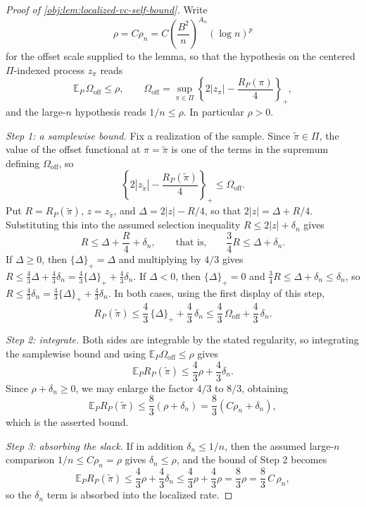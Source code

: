 \documentclass[11pt]{article}
\begin{document}
\begin{proof}[Proof of \cref{obj:lem:localized-vc-self-bound}]
Write
\[
\rho=C\rho_n=C\left(\frac{B^2}{n}\right)^{A_\alpha}(\log n)^p
\]
for the offset scale supplied to the lemma, so that the hypothesis on the centered \(\Pi\)-indexed process \(z_\pi\) reads
\[
\mathbb E_P\,\Omega_{\mathrm{off}}\le\rho,
\qquad
\Omega_{\mathrm{off}}=
\sup_{\pi\in\Pi}
\left\{2|z_\pi|-\frac{R_P(\pi)}4\right\}_{+},
\]
and the large-\(n\) hypothesis reads \(1/n\le\rho\).  In particular \(\rho>0\).

\emph{Step 1: a samplewise bound.}  Fix a realization of the sample.  Since \(\widetilde\pi\in\Pi\), the value of the offset functional at \(\pi=\widetilde\pi\) is one of the terms in the supremum defining \(\Omega_{\mathrm{off}}\), so
\[
\left\{2|z_{\widetilde\pi}|-\frac{R_P(\widetilde\pi)}4\right\}_{+}\le\Omega_{\mathrm{off}} .
\]
Put \(R=R_P(\widetilde\pi)\), \(z=z_{\widetilde\pi}\), and \(\Delta=2|z|-R/4\), so that \(2|z|=\Delta+R/4\).  Substituting this into the assumed selection inequality \(R\le2|z|+\delta_n\) gives
\[
R\le \Delta+\frac R4+\delta_n,
\qquad\text{that is,}\qquad
\frac34R\le \Delta+\delta_n .
\]
If \(\Delta\ge0\), then \(\{\Delta\}_+=\Delta\) and multiplying by \(4/3\) gives \(R\le \tfrac43\Delta+\tfrac43\delta_n=\tfrac43\{\Delta\}_++\tfrac43\delta_n\).  If \(\Delta<0\), then \(\{\Delta\}_+=0\) and \(\tfrac34R\le \Delta+\delta_n\le\delta_n\), so \(R\le\tfrac43\delta_n=\tfrac43\{\Delta\}_++\tfrac43\delta_n\).  In both cases, using the first display of this step,
\[
R_P(\widetilde\pi)
\le
\frac43\,\{\Delta\}_+
+\frac43\,\delta_n
\le
\frac43\,\Omega_{\mathrm{off}}+\frac43\,\delta_n .
\]

\emph{Step 2: integrate.}  Both sides are integrable by the stated regularity, so integrating the samplewise bound and using \(\mathbb E_P\Omega_{\mathrm{off}}\le\rho\) gives
\[
\mathbb E_P R_P(\widetilde\pi)
\le
\frac43\rho+\frac43\delta_n .
\]
Since \(\rho+\delta_n\ge0\), we may enlarge the factor \(4/3\) to \(8/3\), obtaining
\[
\mathbb E_P R_P(\widetilde\pi)
\le
\frac83(\rho+\delta_n)
=
\frac83\left(C\rho_n+\delta_n\right),
\]
which is the asserted bound. %

\emph{Step 3: absorbing the slack.}  If in addition \(\delta_n\le1/n\), then the assumed large-\(n\) comparison \(1/n\le C\rho_n=\rho\) gives \(\delta_n\le\rho\), and the bound of Step 2 becomes
\[
\mathbb E_P R_P(\widetilde\pi)
\le
\frac43\rho+\frac43\delta_n
\le
\frac43\rho+\frac43\rho
=
\frac83\rho
=
\frac83\,C\,\rho_n ,
\]
so the \(\delta_n\) term is absorbed into the localized rate. %
\end{proof}
\end{document}
